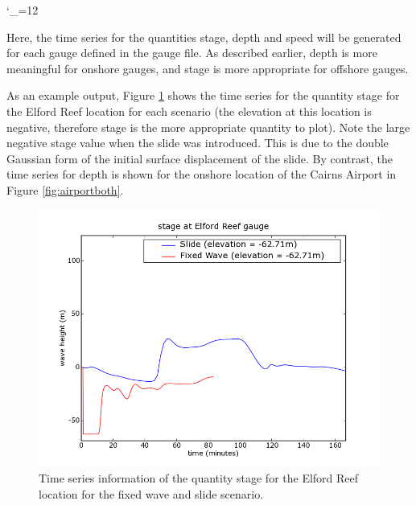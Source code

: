 \documentclass{manual}
\newcommand{\verbatiminputB}[1]{%
\endgroup}
\def\verbatiminputunderscore{\begingroup 
\catcode`\_=12
\verbatiminputB}
\begin{document}
\verbatiminputunderscore{../../anuga_core/examples/cairns/GetTimeseries.py}

Here, the time series for the quantities stage, depth and speed will be generated for
each gauge defined in the gauge file. As described earlier, depth is more meaningful
for onshore gauges, and stage is more appropriate for offshore gauges.

As an example output,
Figure \ref{fig:reef} shows the time series for the quantity stage for the
Elford Reef location for each scenario (the elevation at this location is negative,
therefore stage is the more appropriate quantity to plot). Note the large negative stage value when the slide was
introduced. This is due to the double Gaussian form of the initial surface
displacement of the slide. By contrast, the time series for depth is shown for the onshore location of the Cairns
Airport in Figure \ref{fig:airportboth}.

\begin{figure}[htp]
  \centerline{\includegraphics[scale=0.5]{graphics/gaugeElfordReefstage.png}}
  \caption{Time series information of the quantity stage for the Elford Reef location for the
           fixed wave and slide scenario.}
  \label{fig:reef}
\end{figure}
\end{document}
